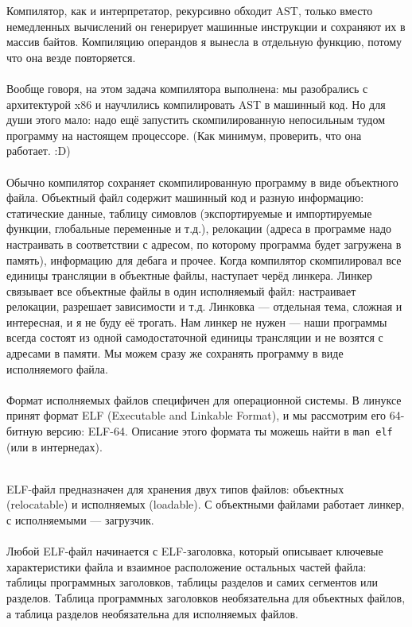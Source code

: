 \documentclass[11pt]{book}
\begin{document}
Компилятор, как и интерпретатор, рекурсивно обходит AST,
только вместо немедленных вычислений он генерирует машинные инструкции и сохраняют их в массив байтов.
Компиляцию операндов я вынесла в отдельную функцию, потому что она везде повторяется.
\\ \\
Вообще говоря, на этом задача компилятора выполнена: мы разобрались с архитектурой x86 и научлились компилировать AST в машинный код.
Но для души этого мало: надо ещё запустить скомпилированную непосильным тудом программу на настоящем процессоре.
(Как минимум, проверить, что она работает. :D)
\\ \\
Обычно компилятор сохраняет скомпилированную программу в виде объектного файла.
Объектный файл содержит машинный код и разную информацию: статические данные,
таблицу симовлов (экспортируемые и импортируемые функции, глобальные переменные и т.д.),
релокации (адреса в программе надо настраивать в соответствии с адресом, по которому программа будет загружена в память),
информацию для дебага и прочее.
Когда компилятор скомпилировал все единицы трансляции в объектные файлы, наступает черёд линкера.
Линкер связывает все объектные файлы в один исполняемый файл: настраивает релокации, разрешает зависимости и т.д.
Линковка --- отдельная тема, сложная и интересная, и я не буду её трогать.
Нам линкер не нужен --- наши программы всегда состоят из одной самодостаточной единицы трансляции и не возятся с адресами в памяти.
Мы можем сразу же сохранять программу в виде исполняемого файла.
\\ \\
Формат исполняемых файлов специфичен для операционной системы.
В линуксе принят формат ELF (Executable and Linkable Format), и мы рассмотрим его 64-битную версию: ELF-64.
Описание этого формата ты можешь найти в \texttt{man elf} (или в интернедах).
\\ \\
\begin{minipage}{0.5\textwidth}
ELF-файл предназначен для хранения двух типов файлов: объектных (relocatable) и исполняемых (loadable).
С объектными файлами работает линкер, с исполняемыми --- загрузчик.
\\ \\
Любой ELF-файл начинается с ELF-заголовка, который
описывает ключевые характеристики файла и взаимное расположение остальных частей файла:
таблицы программных заголовков, таблицы разделов и самих сегментов или разделов.
Таблица программных заголовков необязательна для объектных файлов, а таблица разделов необязательна для исполняемых файлов.
\end{minipage}
\end{document}
